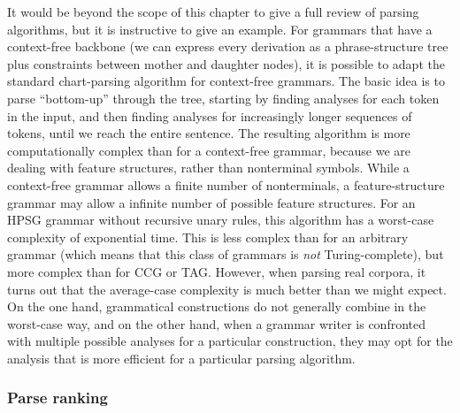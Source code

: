 \documentclass[output=paper,nonflat]{langsci/langscibook}
\begin{document}
It would be beyond the scope of this chapter
to give a full review of parsing algorithms,
but it is instructive to give an example.
For grammars that have a context-free backbone
(we can express every derivation as a phrase-structure tree
plus constraints between mother and daughter nodes),
it is possible to adapt the standard chart-parsing algorithm for context-free grammars.
The basic idea is to parse ``bottom-up'' through the tree,
starting by finding analyses for each token in the input,
and then finding analyses for increasingly longer sequences of tokens,
until we reach the entire sentence.
The resulting algorithm is more computationally complex than for a context-free grammar,
because we are dealing with feature structures, rather than nonterminal symbols.
While a context-free grammar allows a finite number of nonterminals,
a feature-structure grammar may allow a infinite number of possible feature structures.
For an HPSG grammar without recursive unary rules,
this algorithm has a worst-case complexity of exponential time.
This is less complex than for an arbitrary grammar
(which means that this class of grammars is \emph{not} Turing-complete),
but more complex than for CCG or TAG.
However, when parsing real corpora,
it turns out that the average-case complexity is much better than we might expect.
On the one hand, grammatical constructions do not generally combine in the worst-case way,
and on the other hand, when a grammar writer is confronted
with multiple possible analyses for a particular construction,
they may opt for the analysis that is more efficient for a particular parsing algorithm.




\subsubsection{Parse ranking}
\label{cl:prac:rank}
\end{document}
